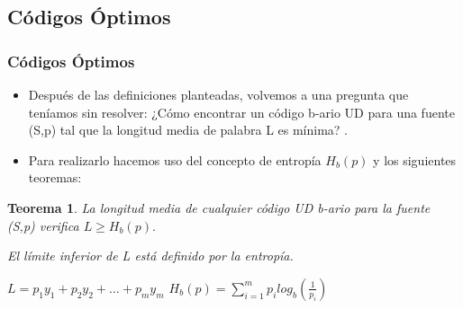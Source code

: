 \documentclass{beamer}
\newtheorem{teorema} [Teorema] {Teorema}
\begin{document}
\subsection{Códigos Óptimos}
\begin{frame}  \frametitle{Códigos Óptimos}\small

\begin{itemize}
\item Después de las definiciones planteadas, volvemos a una pregunta que teníamos sin resolver: ¿Cómo encontrar un código b-ario UD para una fuente (S,p) tal que la  longitud media de palabra  L es mínima? . 

\item Para realizarlo hacemos uso del concepto de entropía $H_b(p)$ y los siguientes teoremas:

\end{itemize}

\begin{teorema}
La longitud media de cualquier código UD b-ario para la fuente (S,p) verifica $L \geq H_b(p).$


\begin{center}

El límite inferior de L está definido por la entropía.
\vspace{0.25cm}

$L=p_1y_1+p_2y_2+ \ldots +p_my_m$ \hspace{0.25cm} \geq \hspace{0.25cm}
$H_b(p) =  \sum^{m}_{i=1} p_i log_b(\frac{1}{p_i})  $
\end{center}

\end{teorema}

\end{frame} 
\end{document}
